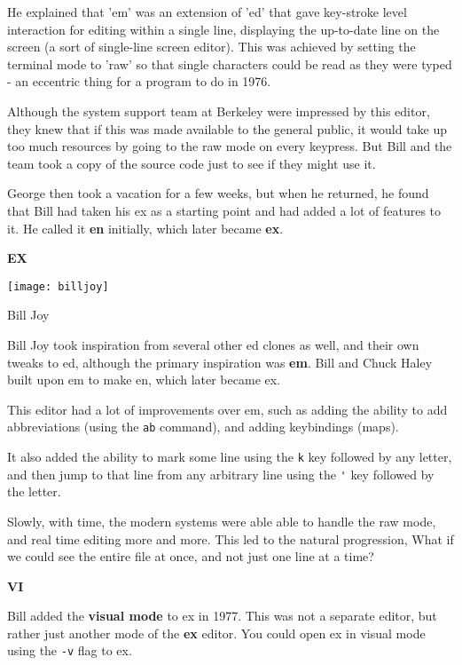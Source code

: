 He explained that 'em' was an extension of 'ed'
that gave key-stroke level interaction for editing
within a single line, displaying the up-to-date line
on the screen (a sort of single-line screen editor).
This was achieved by setting the terminal mode to 'raw'
so that single characters could be read as they were typed
- an eccentric thing for a program to do in 1976.

Although the system support team at Berkeley were
impressed by this editor, they knew that if this
was made available to the general public, it would
take up too much resources by going to the raw mode
on every keypress.
But Bill and the team took a copy of the source code
just to see if they might use it.

George then took a vacation for a few weeks,
but when he returned, he found that Bill had
taken his ex as a starting point and had
added a lot of features to it. He called it
\textbf{en} initially, which later became \textbf{ex}.

\textbf{EX}

\begin{marginfigure}
  \texttt{[image: billjoy]}
  \caption{Bill Joy}
\end{marginfigure}


Bill Joy took inspiration from several other ed clones as well,
and their own tweaks to ed,
although the primary inspiration was \textbf{em}.
Bill and Chuck Haley built upon em to make en, which later became ex.

This editor had a lot of improvements over em,
such as adding the ability to add abbreviations
(using the \lstinline|ab| command),
and adding keybindings (maps).

It also added the ability to mark some line
using the \lstinline|k| key followed by any letter,
and then jump to that line from any arbitrary line
using the \lstinline|'| key followed by the letter.

Slowly, with time, the modern systems were able able
to handle the raw mode, and real time editing more and more.
This led to the natural progression, What if we could
see the entire file at once, and not just one line at a time?

\textbf{VI}

Bill added the \textbf{visual mode} to ex in 1977.
This was not a separate editor, but rather just another mode
of the \textbf{ex} editor.
You could open ex in visual mode using the \lstinline|-v| flag to
ex.

